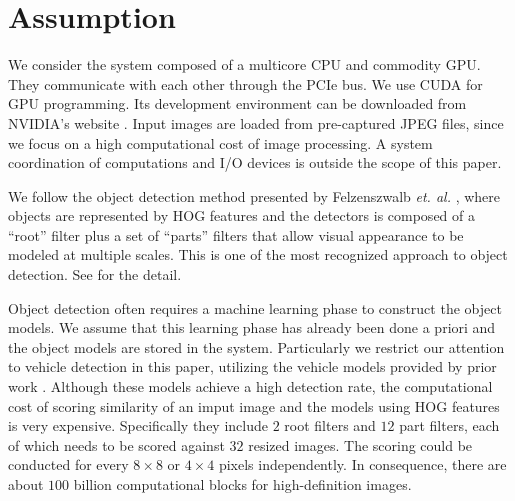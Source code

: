 \section{Assumption}
\label{sec:assumption}

We consider the system composed of a multicore CPU and commodity GPU.
They communicate with each other through the PCIe bus.
We use CUDA \cite{NVIDIA_CUDA} for GPU programming.
Its  development environment can be downloaded from NVIDIA's website
\cite{NVIDIA_NVCC}.
Input images are loaded from pre-captured JPEG files, since we focus on
a high computational cost of image processing.
A system coordination of computations and I/O devices is outside the
scope of this paper.

We follow the object detection method presented by Felzenszwalb
\textit{et. al.} \cite{Felzenszwalb10}, where objects are represented by
HOG features \cite{Dalal05} and the detectors is composed of a ``root''
filter plus a set of ``parts'' filters that allow visual appearance to
be modeled at multiple scales.
This is one of the most recognized approach to object detection.
See \cite{Felzenszwalb10} for the detail.

Object detection often requires a machine learning phase to construct
the object models.
We assume that this learning phase has already been done a priori and
the object models are stored in the system.
Particularly we restrict our attention to vehicle detection in this
paper, utilizing the vehicle models provided by prior work
\cite{Niknejad12}.
Although these models achieve a high detection rate, the computational
cost of scoring similarity of an imput image and the models using HOG
features is very expensive.
Specifically they include $2$ root filters and $12$ part filters, each
of which needs to be scored against $32$ resized images.
The scoring could be conducted for every $8 \times 8$ or $4 \times 4$
pixels independently.
In consequence, there are about $100$ billion computational blocks for
high-definition images.


